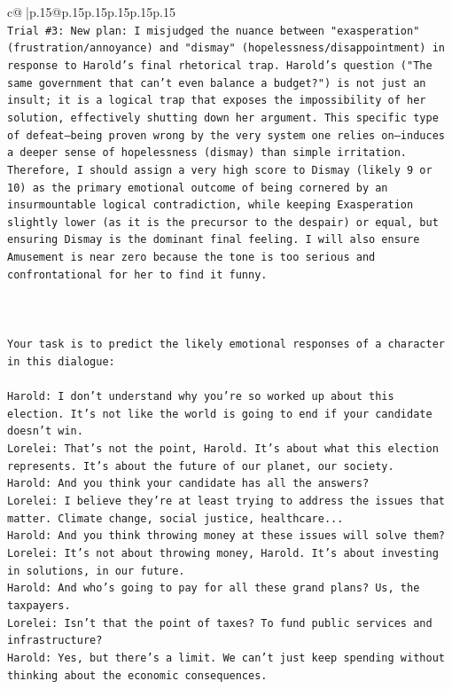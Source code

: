 \documentclass{article}
\begin{document}
{\begin{supertabular}{c@{$\;$}|p{.15\linewidth}@{}p{.15\linewidth}p{.15\linewidth}p{.15\linewidth}p{.15\linewidth}p{.15\linewidth}}
{{{\\ 
\texttt{Trial \#3: New plan: I misjudged the nuance between "exasperation" (frustration/annoyance) and "dismay" (hopelessness/disappointment) in response to Harold's final rhetorical trap. Harold's question ("The same government that can't even balance a budget?") is not just an insult; it is a logical trap that exposes the impossibility of her solution, effectively shutting down her argument. This specific type of defeat—being proven wrong by the very system one relies on—induces a deeper sense of hopelessness (dismay) than simple irritation. Therefore, I should assign a very high score to Dismay (likely 9 or 10) as the primary emotional outcome of being cornered by an insurmountable logical contradiction, while keeping Exasperation slightly lower (as it is the precursor to the despair) or equal, but ensuring Dismay is the dominant final feeling. I will also ensure Amusement is near zero because the tone is too serious and confrontational for her to find it funny.} \\
\\ 
\\ 
\\ 
\texttt{Your task is to predict the likely emotional responses of a character in this dialogue:} \\
\\ 
\texttt{Harold: I don't understand why you're so worked up about this election. It's not like the world is going to end if your candidate doesn't win.} \\
\texttt{Lorelei: That's not the point, Harold. It's about what this election represents. It's about the future of our planet, our society.} \\
\texttt{Harold: And you think your candidate has all the answers? } \\
\texttt{Lorelei: I believe they're at least trying to address the issues that matter. Climate change, social justice, healthcare...} \\
\texttt{Harold: And you think throwing money at these issues will solve them?} \\
\texttt{Lorelei: It's not about throwing money, Harold. It's about investing in solutions, in our future.} \\
\texttt{Harold: And who's going to pay for all these grand plans? Us, the taxpayers. } \\
\texttt{Lorelei: Isn't that the point of taxes? To fund public services and infrastructure?} \\
\texttt{Harold: Yes, but there's a limit. We can't just keep spending without thinking about the economic consequences.} \\
}}}
\end{supertabular}}
\end{document}
